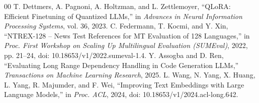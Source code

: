 \documentclass[conference]{IEEEtran}
\begin{document}
\begin{thebibliography}{00}
 T. Dettmers, A. Pagnoni, A. Holtzman, and L. Zettlemoyer, ``QLoRA: Efficient Finetuning of Quantized LLMs,'' in \emph{Advances in Neural Information Processing Systems}, vol. 36, 2023.
 C. Federmann, T. Kocmi, and Y. Xin, ``NTREX-128 -- News Test References for MT Evaluation of 128 Languages,'' in \emph{Proc. First Workshop on Scaling Up Multilingual Evaluation (SUMEval)}, 2022, pp. 21--24, doi: 10.18653/v1/2022.sumeval-1.4.
 Y. Assogba and D. Ren, ``Evaluating Long Range Dependency Handling in Code Generation LLMs,'' \emph{Transactions on Machine Learning Research}, 2025.
 L. Wang, N. Yang, X. Huang, L. Yang, R. Majumder, and F. Wei, ``Improving Text Embeddings with Large Language Models,'' in \emph{Proc. ACL}, 2024, doi: 10.18653/v1/2024.acl-long.642.
\end{thebibliography}
\end{document}
